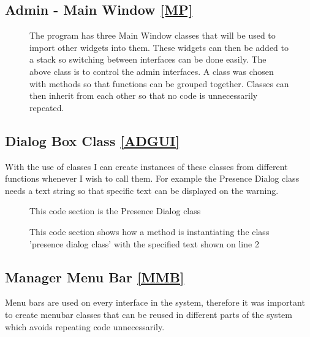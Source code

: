 \subsection{Admin - Main Window \ref{MP}}
\begin{figure}[H]
    \caption{The program has three Main Window classes that will be used to import other widgets into them. These widgets can then be added to a stack so switching between interfaces can be done easily. The above class is to control the admin interfaces. A class was chosen with methods so that functions can be grouped together. Classes can then inherit from each other so that no code is unnecessarily repeated.} \label{fig:MainWindowAdmin}
\end{figure}

\newpage

\subsection{Dialog Box Class \ref{ADGUI}}
With the use of classes I can create instances of these classes from different functions whenever I wish to call them. For example the Presence Dialog class needs a text string so that specific text can be displayed on the warning.
\begin{figure}[H]
    \caption{This code section is the Presence Dialog class} \label{fig:Dialog Class}
\end{figure}

\begin{figure}[H]
    \caption{This code section shows how a method is instantiating the class 'presence dialog class' with the specified text shown on line 2} \label{fig:Dialog Class}
\end{figure}

\subsection{Manager Menu Bar \ref{MMB}}

Menu bars are used on every interface in the system, therefore it was important to create menubar classes that can be reused in different parts of the system which avoids repeating code unnecessarily.  

